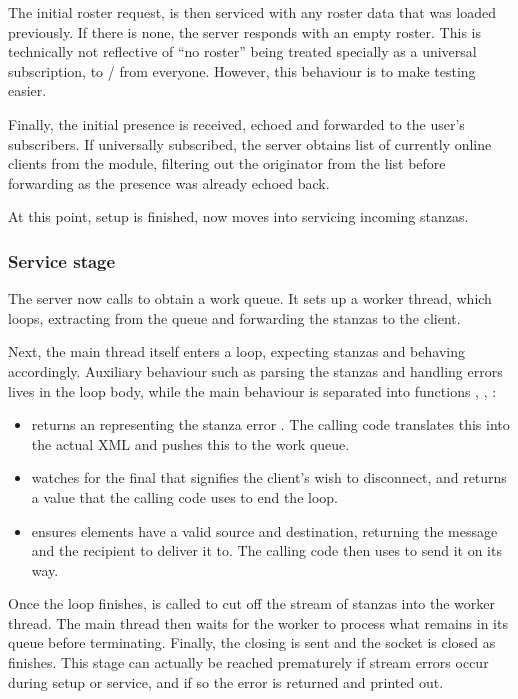 The initial roster request, is then serviced with any roster data that was loaded previously. If there is none, the server responds with an empty roster. This is technically not reflective of ``no roster'' being treated specially as a universal subscription, to / from everyone. However, this behaviour is to make testing easier.

Finally, the initial presence is received, echoed and forwarded to the user's subscribers. If universally subscribed, the server obtains list of currently online clients from the  module, filtering out the originator from the list before forwarding as the presence was already echoed back.

At this point, setup is finished, now moves into servicing incoming stanzas.

\subsubsection{Service stage}
The server now calls  to obtain a work queue. It sets up a worker thread, which loops, extracting from the queue and forwarding the stanzas to the client.

Next, the main thread itself enters a loop, expecting stanzas and behaving accordingly. Auxiliary behaviour such as parsing the stanzas and handling errors lives in the loop body, while the main behaviour is separated into functions , , :

\begin{itemize}
  \item {} returns an  representing the stanza error . The calling code translates this into the actual XML and pushes this to the work queue.

  \item {} watches for the final  that signifies the client's wish to disconnect, and returns a value that the calling code uses to end the loop.

  \item {} ensures  elements have a valid source and destination, returning the message and the recipient to deliver it to. The calling code then uses  to send it on its way.
\end{itemize}

Once the loop finishes,  is called to cut off the stream of stanzas into the worker thread. The main thread then waits for the worker to process what remains in its queue before terminating. Finally, the closing  is sent and the socket is closed as  finishes. This stage can actually be reached prematurely if stream errors occur during setup or service, and if so the error is returned and printed out.

